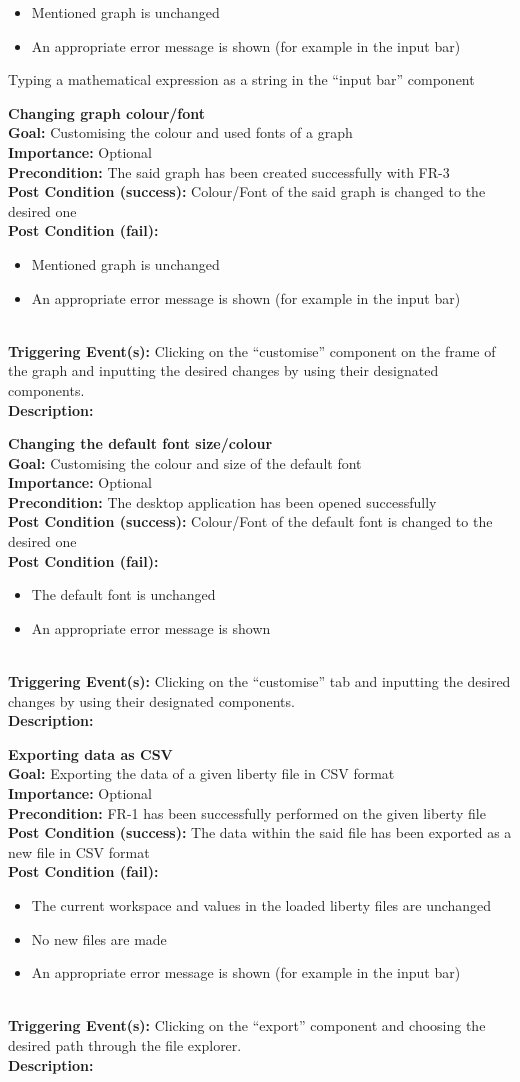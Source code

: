 \documentclass[10pt,a4paper]{report}
\newcommand{\FRODescription}[8]{
    \textbf{#1} \\
    \textbf{Goal: } #2 \\
    \textbf{Importance: } #3 \\
    \textbf{Precondition: } #4 \\
    \textbf{Post Condition (success): } #5 \\
    \textbf{Post Condition (fail): } #6 \\
    \textbf{Triggering Event(s): } #7 \\
    \textbf{Description: } \\ 
    #8}
\begin{document}
\begin{FRO}
{\begin{itemize}
        \item Mentioned graph is unchanged
        \item An appropriate error message is shown (for example in the input bar)
    \end{itemize}}
    {Typing a mathematical expression as a string in the “input bar” component}
    \item \FRODescription{Changing graph colour/font}
    {Customising the colour and used fonts of a graph}
    {Optional}
    {The said graph has been created successfully with FR-3}
    {Colour/Font of the said graph is changed to the desired one}
    {\begin{itemize}
        \item Mentioned graph is unchanged
        \item An appropriate error message is shown (for example in the input bar)
    \end{itemize}}
    {Clicking on the “customise” component on the frame of the graph and inputting the desired changes by using their designated components.}
    \item \FRODescription{Changing the default font size/colour}
    {Customising the colour and size of the default font}
    {Optional}
    {The desktop application has been opened successfully}
    {Colour/Font of the default font is changed to the desired one}
    {\begin{itemize}
        \item The default font is unchanged
        \item An appropriate error message is shown
    \end{itemize}}
    {Clicking on the “customise” tab and inputting the desired changes by using their designated components.}
    \item \FRODescription{Exporting data as CSV}
    {Exporting the data of a given liberty file in CSV format}
    {Optional}
    {FR-1 has been successfully performed on the given liberty file}
    {The data within the said file has been exported as a new file in CSV format}
    {\begin{itemize}
        \item The current workspace and values in the loaded liberty files are unchanged
        \item No new files are made
        \item An appropriate error message is shown (for example in the input bar)
    \end{itemize}}
    {Clicking on the “export” component and choosing the desired path through the file explorer.}

\end{FRO}
\end{document}
